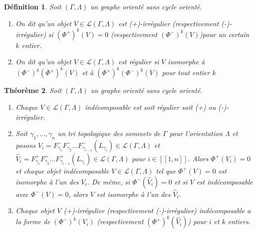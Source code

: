 \documentclass[a4paper,10pt]{article}
\newtheorem{thm}{Théorème}[section]
\newtheorem{defi}[thm]{Définition}%
\begin{document}
\begin{defi}
  Soit $(\Gamma,\Lambda)$ un graphe orienté sans cycle orienté. 
  \begin{enumerate}
  \item On dit qu'un objet $V \in \mathscr L(\Gamma,\Lambda)$ est \emph{(+)-irrégulier} (respectivement \emph{(-)-irrégulier}) si $(\Phi^{+})^{k}(V) = 0$ (respectivement $(\Phi^{-})^{k}(V)$)pour un certain $k$ entier.
  \item On dit qu'un objet $V \in \mathscr L(\Gamma,\Lambda)$ est \emph{régulier} si $V$ isomorphe à $(\Phi^{-})^{k}(\Phi^{+})^{k}(V)$ et à $(\Phi^{+})^{k}(\Phi^{-})^{k}(V)$ pour tout entier $k$
  \end{enumerate}
\end{defi}
\begin{thm}
\label{thm3}
  Soit $(\Gamma,\Lambda)$ un graphe orienté sans cycle orienté.
  \begin{enumerate}
  \item Chaque $V \in \mathscr L(\Gamma,\Lambda)$ indécomposable est soit régulier soit (+) ou (-)-irrégulier.
  \item Soit $\gamma_{1},\dots,\gamma_{n}$ un tri topologique des sommets de $\Gamma$ pour l'orientation $\Lambda$ et posons $V_{i} = F^{-}_{\gamma_{1}}F^{-}_{\gamma_{2}} \dots F^{-}_{\gamma_{i-1}}(L_{\gamma_{i}}) \in \mathscr L(\Gamma,\Lambda)$ et  $\widehat V_{i} = F^{+}_{\gamma_{1}}F^{+}_{\gamma_{2}} \dots F^{+}_{\gamma_{i-1}}(L_{\gamma_{i}}) \in \mathscr L(\Gamma,\Lambda)$ pour $i \in [\![1,n]\!]$. Alors $\Phi^{+}(V_{i})=0$ et chaque objet indécomposable $V \in \mathscr L(\Gamma,\Lambda)$ tel que $\Phi^{+}(V) =0$ est isomorphe à l'un des $V_{i}$. De même, si $\Phi^{-}(\widehat V_{i}) = 0$ et si $V$ est indécomposable avec $\Phi^{-}(V) = 0$, alors $V$ est isomorphe à l'un des $\widehat V_{i}$.
\item  Chaque objet $V$ (+)-irrégulier (respectivement (-)-irrégulier) indécomposable a la forme de $(\Phi^{-})^{k}(V_{i})$ (respectivement $(\Phi^{+})^{k}(\widehat V_{i})$) pour $i$ et $k$ entiers.
  \end{enumerate}
\end{thm}
\end{document}
